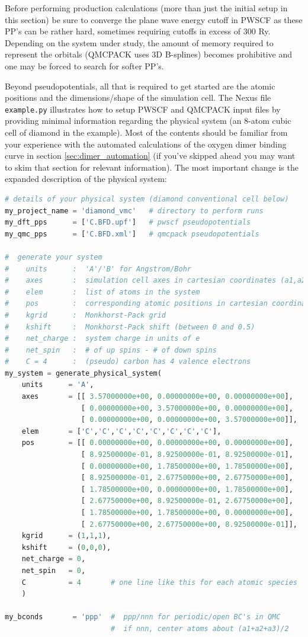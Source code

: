 Before performing production calculations (more than just the initial setup in this section) be sure to converge the plane wave energy cutoff in PWSCF as these PP's can be rather hard, sometimes requiring cutoffs in excess of 300 Ry.  Depending on the system under study, the amount of memory required to represent the orbitals (QMCPACK uses 3D B-splines) becomes prohibitive and one may be forced to search for softer PP's.

Beyond pseudopotentials, all that is required to get started are the atomic positions and the dimensions/shape of the simulation cell.  The Nexus file \texttt{example.py} illustrates how to setup PWSCF and QMCPACK input files by providing minimal information regarding the physical system (an 8-atom cubic cell of diamond in the example).  Most of the contents should be familiar from your experience with the automated calculations of the oxygen dimer binding curve in section \ref{sec:dimer_automation} (if you've skipped ahead you may want to skim that section for relevant information).  The most important change is the expanded description of the physical system:

\begin{lstlisting}[language=Python]
# details of your physical system (diamond conventional cell below)
my_project_name = 'diamond_vmc'   # directory to perform runs
my_dft_pps      = ['C.BFD.upf']   # pwscf pseudopotentials
my_qmc_pps      = ['C.BFD.xml']   # qmcpack pseudopotentials

#  generate your system
#    units      :  'A'/'B' for Angstrom/Bohr
#    axes       :  simulation cell axes in cartesian coordinates (a1,a2,a3)
#    elem       :  list of atoms in the system
#    pos        :  corresponding atomic positions in cartesian coordinates
#    kgrid      :  Monkhorst-Pack grid
#    kshift     :  Monkhorst-Pack shift (between 0 and 0.5)
#    net_charge :  system charge in units of e
#    net_spin   :  # of up spins - # of down spins
#    C = 4      :  (pseudo) carbon has 4 valence electrons
my_system = generate_physical_system(
    units      = 'A',
    axes       = [[ 3.57000000e+00, 0.00000000e+00, 0.00000000e+00],
                  [ 0.00000000e+00, 3.57000000e+00, 0.00000000e+00],
                  [ 0.00000000e+00, 0.00000000e+00, 3.57000000e+00]],
    elem       = ['C','C','C','C','C','C','C','C'],
    pos        = [[ 0.00000000e+00, 0.00000000e+00, 0.00000000e+00],
                  [ 8.92500000e-01, 8.92500000e-01, 8.92500000e-01],
                  [ 0.00000000e+00, 1.78500000e+00, 1.78500000e+00],
                  [ 8.92500000e-01, 2.67750000e+00, 2.67750000e+00],
                  [ 1.78500000e+00, 0.00000000e+00, 1.78500000e+00],
                  [ 2.67750000e+00, 8.92500000e-01, 2.67750000e+00],
                  [ 1.78500000e+00, 1.78500000e+00, 0.00000000e+00],
                  [ 2.67750000e+00, 2.67750000e+00, 8.92500000e-01]],
    kgrid      = (1,1,1),
    kshift     = (0,0,0),
    net_charge = 0,
    net_spin   = 0,
    C          = 4       # one line like this for each atomic species
    )

my_bconds       = 'ppp'  #  ppp/nnn for periodic/open BC's in QMC
                         #  if nnn, center atoms about (a1+a2+a3)/2
\end{lstlisting}

